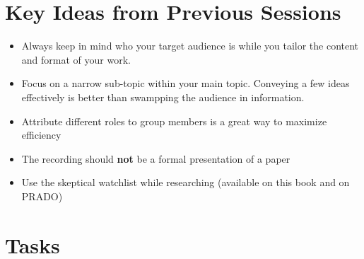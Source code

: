 \documentclass[
  letterpaper,
  DIV=11,
  numbers=noendperiod]{scrreprt}
\providecommand{\tightlist}{%
  \setlength{\itemsep}{0pt}\setlength{\parskip}{0pt}}\usepackage{longtable,booktabs,array}
\begin{document}
\section{Key Ideas from Previous
Sessions}\label{key-ideas-from-previous-sessions}

\begin{itemize}
\tightlist
\item
  Always keep in mind who your target audience is while you tailor the
  content and format of your work.
\item
  Focus on a narrow sub-topic within your main topic. Conveying a few
  ideas effectively is better than swampping the audience in
  information.
\item
  Attribute different roles to group members is a great way to maximize
  efficiency
\item
  The recording should \textbf{not} be a formal presentation of a paper
\item
  Use the skeptical watchlist while researching (available on this book
  and on PRADO)
\end{itemize}

\section{Tasks}\label{tasks-1}
\end{document}
